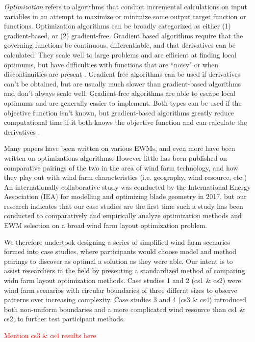     \textit{Optimization} refers to algorithms that conduct incremental calculations on input variables in an attempt to maximize or minimize some output target function or functions.
    Optimization algorithms can be broadly categorized as either (1) gradient-based, or (2) gradient-free.   
    Gradient based algorithms require that the governing functions be continuous, differentiable, and that derivatives can be calculated.
    They scale well to large problems and are efficient at finding local optimums, but have difficulties with functions that are ``noisy" or when discontinuities are present \cite{Nocedal2006}.
    Gradient free algorithms can be used if derivatives can't be obtained, but are usually much slower than gradient-based algorithms and don't always scale well.
    Gradient-free algorithms are able to escape local optimums and are generally easier to implement.
    Both types can be used if the objective function isn't known, but gradient-based algorithms greatly reduce computational time if it both knows the objective function and can calculate the derivatives \cite{Kramer2011}.

    Many papers have been written on various EWMs, and even more have been written on optimizations algorithms.
    However little has been published on comparative pairings of the two in the area of wind farm technology, and how they play out with wind farm characteristics (i.e. geography, wind resource, etc.)
    An internationally collaborative study was conducted by the International Energy Association (IEA) for modelling and optimizing blade geometry \cite{IEATask372017} in 2017,
    but our research indicates that our case studies are the first time such a study has been conducted to comparatively and empirically analyze optimization methods and EWM selection on a broad wind farm layout optimization problem.

    We therefore undertook designing a series of simplified wind farm scenarios formed into case studies, where participants would choose model and method pairings to discover as optimal a solution as they were able.
    Our intent is to assist researchers in the field by presenting a standardized method of comparing widn farm layout optimization methods.
    Case studies 1 and 2 (cs1 \& cs2) were wind farm scenarios with circular boundaries of three differnt sizes to observe patterns over increasing complexity.
    Case studies 3 and 4 (cs3 \& cs4) introduced both non-uniform boundaries and a more complicated wind resource than cs1 \& cs2, to further test participant methods.

    \textcolor{red}{Mention cs3 \& cs4 results here}

